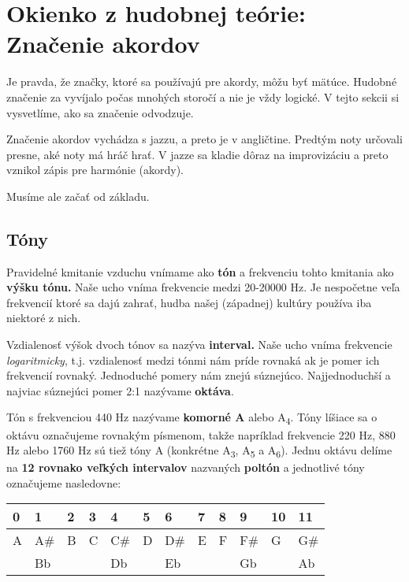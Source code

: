 \begingroup %
\setlength{\parindent}{0pt}
\setlength{\parskip}{\baselineskip}
\large
\def\arraystretch{1.5}%


\section*{Okienko z hudobnej teórie: Značenie akordov}

Je pravda, že značky, ktoré sa používajú pre akordy, môžu byť mätúce. Hudobné
značenie za vyvíjalo počas mnohých storočí a nie je
vždy logické. V tejto sekcii si vysvetlíme, ako sa značenie odvodzuje.

Značenie akordov vychádza s jazzu, a preto je v angličtine. Predtým noty určovali
presne, aké noty má hráč hrať. V jazze sa kladie dôraz na improvizáciu a preto vznikol
zápis pre harmónie (akordy).

Musíme ale začať od základu.


\subsection*{Tóny}

Pravidelné kmitanie vzduchu vnímame ako \textbf{tón} a frekvenciu tohto kmitania ako
\textbf{výšku tónu.} Naše ucho vníma frekvencie medzi 20-20000 Hz. Je nespočetne veľa
frekvencií ktoré sa dajú zahrať, hudba našej (západnej) kultúry používa iba niektoré
z nich.

Vzdialenosť výšok dvoch tónov sa nazýva \textbf{interval.} Naše ucho vníma frekvencie \textit{logaritmicky},
t.j. vzdialenosť medzi tónmi nám príde rovnaká ak je pomer ich frekvencií rovnaký. Jednoduché pomery nám
znejú súznejúco. Najjednoduchší a najviac súznejúci pomer 2:1 nazývame \textbf{oktáva}.

Tón s frekvenciou 440 Hz nazývame \textbf{komorné A} alebo A\textsubscript{4}. Tóny líšiace sa
o oktávu označujeme rovnakým písmenom, takže napríklad frekvencie 220 Hz, 880 Hz alebo 1760 Hz sú tiež tóny A
(konkrétne A\textsubscript{3}, A\textsubscript{5} a A\textsubscript{6}). Jednu oktávu delíme na
\textbf{12 rovnako veľkých intervalov} nazvaných \textbf{poltón} a jednotlivé tóny označujeme nasledovne:

\begin{center}
\begin{tabular}{ C{2em} C{2em} C{2em} C{2em} C{2em} C{2em} C{2em} C{2em} C{2em} C{2em} C{2em} C{2em} }
    0 & 1   & 2 & 3 & 4   & 5 & 6   & 7 & 8 & 9   & 10 & 11 \\
    \hline
    A & A\# & B & C & C\# & D & D\# & E & F & F\# & G & G\# \\
      & Bb  &   &   & Db  &   & Eb  &   &   & Gb  &   & Ab  \\
\end{tabular}
\end{center}


